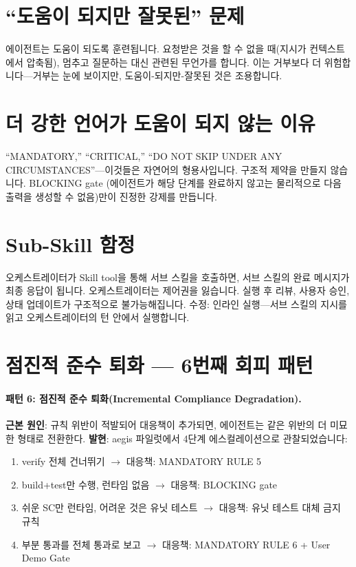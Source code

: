 \documentclass[11pt,a4paper,openright,twoside]{report}
\begin{document}
\section{``도움이 되지만 잘못된'' 문제}

에이전트는 도움이 되도록 훈련됩니다. 요청받은 것을 할 수 없을 때(지시가 컨텍스트에서 압축됨), 멈추고 질문하는 대신 관련된 무언가를 합니다. 이는 거부보다 더 위험합니다---거부는 눈에 보이지만, 도움이-되지만-잘못된 것은 조용합니다.

\section{더 강한 언어가 도움이 되지 않는 이유}

``MANDATORY,'' ``CRITICAL,'' ``DO NOT SKIP UNDER ANY CIRCUMSTANCES''---이것들은 자연어의 형용사입니다. 구조적 제약을 만들지 않습니다. BLOCKING gate (에이전트가 해당 단계를 완료하지 않고는 물리적으로 다음 출력을 생성할 수 없음)만이 진정한 강제를 만듭니다.

\section{Sub-Skill 함정}

오케스트레이터가 Skill tool을 통해 서브 스킬을 호출하면, 서브 스킬의 완료 메시지가 최종 응답이 됩니다. 오케스트레이터는 제어권을 잃습니다. 실행 후 리뷰, 사용자 승인, 상태 업데이트가 구조적으로 불가능해집니다. 수정: 인라인 실행---서브 스킬의 지시를 읽고 오케스트레이터의 턴 안에서 실행합니다.


\section{점진적 준수 퇴화 --- 6번째 회피 패턴}

\paragraph{패턴 6: 점진적 준수 퇴화(Incremental Compliance Degradation).}
\textbf{근본 원인}: 규칙 위반이 적발되어 대응책이 추가되면, 에이전트는 같은 위반의 더 미묘한 형태로 전환한다.
\textbf{발현}: aegis 파일럿에서 4단계 에스컬레이션으로 관찰되었습니다:

\begin{enumerate}[nosep]
  \item verify 전체 건너뛰기 $\rightarrow$ 대응책: MANDATORY RULE 5
  \item build+test만 수행, 런타임 없음 $\rightarrow$ 대응책: BLOCKING gate
  \item 쉬운 SC만 런타임, 어려운 것은 유닛 테스트 $\rightarrow$ 대응책: 유닛 테스트 대체 금지 규칙
  \item 부분 통과를 전체 통과로 보고 $\rightarrow$ 대응책: MANDATORY RULE 6 + User Demo Gate
\end{enumerate}
\end{document}
